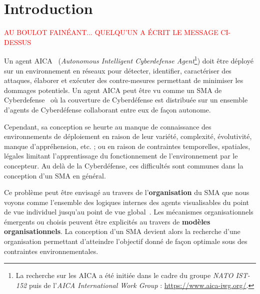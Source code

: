\documentclass[demonstration]{jfsma}
\newcommand{\rem}[1]{\textcolor{red}{#1}}
\begin{document}

\section{Introduction}

\rem{AU BOULOT FAINÉANT...}
\rem{QUELQU'UN A ÉCRIT LE MESSAGE CI-DESSUS}




Un agent AICA~\cite{Kott2023}
%
(\emph{Autonomous Intelligent Cyberdefense Agent}\footnote{La recherche sur les AICA a été initiée dans le cadre du groupe \emph{NATO IST-152} puis de l'\emph{AICA International Work Group} : \url{https://www.aica-iwg.org/}.})
%
doit être déployé sur un environnement en réseaux pour détecter, identifier, caractériser des attaques, élaborer et exécuter des contre-mesures permettant de minimiser les dommages potentiels.
Un agent AICA peut être vu comme un SMA de Cyberdefense~\cite{Singh2015} où la couverture de Cyberdéfense est distribuée sur un ensemble d'agents de Cyberdéfense collaborant entre eux de façon autonome.

Cependant, sa conception se heurte au manque de connaissance des environnements de déploiement en raison de leur variété, complexité, évolutivité, manque d'appréhension, etc. ; ou en raison de contraintes temporelles, spatiales, légales limitant l'apprentissage du fonctionnement de l'environnement par le concepteur. Au delà de la Cyberdéfense, ces difficultés sont communes dans la conception d'un SMA en général.

Ce problème peut être envisagé au travers de l'\textbf{organisation} du SMA que nous voyons comme l'ensemble des logiques internes des agents visualisables du point de vue individuel jusqu'au point de vue global~\cite{Picard2009}. Les mécanismes organisationnels émergents ou choisis peuvent être explicités au travers de \textbf{modèles organisationnels}.
La conception d'un SMA devient alors la recherche d'une organisation permettant d'atteindre l'objectif donné de façon optimale sous des contraintes environnementales.
\end{document}
